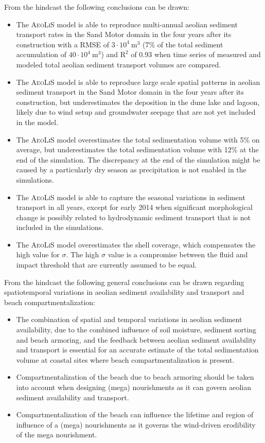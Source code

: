 \bigskip

\noindent From the hindcast the following conclusions can be drawn:

\begin{itemize}
\item The \textsc{AeoLiS} model is able to reproduce multi-annual
  aeolian sediment transport rates in the Sand Motor domain in the
  four years after its construction with a RMSE of $3 \cdot 10^4 ~
  \mathrm{m^3}$ (7\% of the total sediment accumulation of $40 \cdot
  10^4 ~ \mathrm{m^3}$) and $\mathrm{R^2}$ of 0.93 when time series of
  measured and modeled total aeolian sediment transport volumes are
  compared.
\item The \textsc{AeoLiS} model is able to reproduce large scale
  spatial patterns in aeolian sediment transport in the Sand Motor
  domain in the four years after its construction, but underestimates
  the deposition in the dune lake and lagoon, likely due to wind setup
  and groundwater seepage that are not yet included in the model.
\item The \textsc{AeoLiS} model overestimates the total sedimentation
  volume with 5\% on average, but underestimates the total
  sedimentation volume with 12\% at the end of the simulation. The
  discrepancy at the end of the simulation might be caused by a
  particularly dry season as precipitation is not enabled in the
  simulations.
\item The \textsc{AeoLiS} model is able to capture the seasonal
  variations in sediment transport in all years, except for early 2014
  when significant morphological change is possibly related to
  hydrodynamic sediment transport that is not included in the
  simulations.
\item The \textsc{AeoLiS} model overestimates the shell coverage,
  which compensates the high value for $\sigma$. The high $\sigma$
  value is a compromise between the fluid and impact threshold that
  are currently assumed to be equal.
\end{itemize}

\noindent From the hindcast the following general conclusions can be
drawn regarding spatiotemporal variations in aeolian sediment
availability and transport and beach compartmentalization:

\begin{itemize}
\item The combination of spatial and temporal variations in aeolian
  sediment availability, due to the combined influence of soil
  moisture, sediment sorting and beach armoring, and the feedback
  between aeolian sediment availability and transport is essential for
  an accurate estimate of the total sedimentation volume at coastal
  sites where beach compartmentalization is present.
\item Compartmentalization of the beach due to beach armoring should
  be taken into account when designing (mega) nourishments as it
  can govern aeolian sediment availability and transport.
\item Compartmentalization of the beach can influence the lifetime and
  region of influence of a (mega) nourishments as it governs the
  wind-driven erodibility of the mega nourishment.
\end{itemize}

